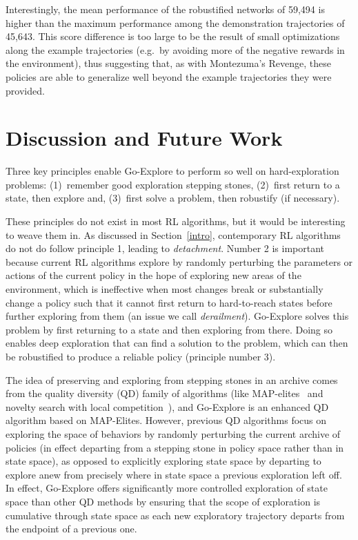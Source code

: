\documentclass{article}
\begin{document}
Interestingly, the mean performance of the robustified networks of 59,494 is higher than the maximum performance among the demonstration trajectories of 45,643. This score difference is too large to be the result of small optimizations along the example trajectories (e.g.\ by avoiding more of the negative rewards in the environment), thus suggesting that, as with Montezuma's Revenge, these policies are able to generalize well beyond the example trajectories they were provided.

\section{Discussion and Future Work}
\label{sec:discussion_and_future_work}

Three key principles enable Go-Explore to perform so well on hard-exploration problems: (1)~remember good exploration stepping stones, (2)~first return to a state, then explore and, (3)~first solve a problem, then robustify (if necessary). 

These principles do not exist in most RL algorithms, but it would be interesting to weave them in. As discussed in Section~\ref{intro}, contemporary RL algorithms do not do follow principle 1, leading to \emph{detachment}. Number 2 is important because current RL algorithms explore by randomly perturbing the parameters or actions of the current policy in the hope of exploring new areas of the environment, which is ineffective when most changes break or substantially change a policy such that it cannot first return to hard-to-reach states before further exploring from them (an issue we call \emph{derailment}). 
Go-Explore solves this problem by first returning to a state and then exploring from there. Doing so enables deep exploration that can find a solution to the problem, which can then be robustified to produce a reliable policy (principle number 3). 

The idea of preserving and exploring from stepping stones in an archive comes from the quality diversity (QD) family of algorithms (like MAP-elites~\cite{cully:nature15,mouret:arxiv15} and novelty search with local competition~\cite{lehman:gecco11}), and Go-Explore is an enhanced QD algorithm based on MAP-Elites. However, previous QD algorithms focus on exploring the space of behaviors by randomly perturbing the current archive of policies (in effect departing from a stepping stone in policy space rather than in state space), as opposed to explicitly exploring state space by departing to explore anew from precisely where in state space a previous exploration left off. In effect, Go-Explore offers significantly more controlled exploration of state space than other QD methods by ensuring that the scope of exploration is cumulative through state space as each new exploratory trajectory departs from the endpoint of a previous one.
\end{document}
